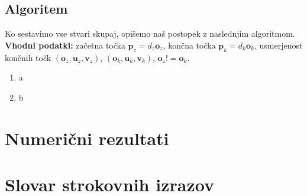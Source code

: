 \documentclass[mat1]{fmfdelo}
\newcommand{\pp}{\boldsymbol p}
\newcommand{\oo}{\boldsymbol o}
\newcommand{\uu}{\boldsymbol u}
\newcommand{\vv}{\boldsymbol v}
\begin{document}

\subsection{Algoritem}
Ko sestavimo vse stvari skupaj, opišemo naš postopek z naslednjim algoritmom.\\
\textbf{Vhodni podatki:} začetna točka $\pp_z = d_z \oo_z$, končna točka $\pp_k = d_k \oo_k$, usmerjenost končnih točk $\left( \oo_z, \uu_z, \vv_z\right)$,  $\left( \oo_k, \uu_k, \vv_k\right)$, $\oo_z != \oo_k$.
\begin{enumerate}
	\item a
	\item b
\end{enumerate}

\section{Numerični rezultati}


\section*{Slovar strokovnih izrazov}

\geslo{}{}
\geslo{}{}

\begin{thebibliography}{99}


\end{thebibliography}
\end{document}
